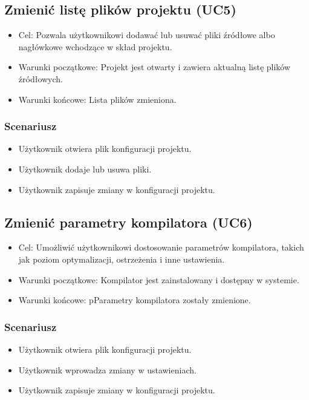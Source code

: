 \subsection{Zmienić listę plików projektu (UC5)}
\begin{itemize}
    \item Cel: Pozwala użytkownikowi dodawać lub usuwać pliki źródłowe albo nagłówkowe wchodzące w skład projektu.
    \item Warunki początkowe: Projekt jest otwarty i zawiera aktualną listę plików źródłowych.
    \item Warunki końcowe: Lista plików zmieniona.
\end{itemize}

\subsubsection{Scenariusz}
\begin{itemize}
    \item Użytkownik otwiera plik konfiguracji projektu.
    \item Użytkownik dodaje lub usuwa pliki.
    \item Użytkownik zapisuje zmiany w konfiguracji projektu.
\end{itemize}

\subsection{Zmienić parametry kompilatora (UC6)}
\begin{itemize}
    \item Cel: Umożliwić użytkownikowi dostosowanie parametrów kompilatora, takich jak poziom optymalizacji, ostrzeżenia i inne ustawienia.
    \item Warunki początkowe: Kompilator jest zainstalowany i dostępny w systemie.
    \item Warunki końcowe: pParametry kompilatora zostały zmienione.
\end{itemize}

\subsubsection{Scenariusz}
\begin{itemize}
    \item Użytkownik otwiera plik konfiguracji projektu.
    \item Użytkownik wprowadza zmiany w ustawieniach.
    \item Użytkownik zapisuje zmiany w konfiguracji projektu.
\end{itemize}

